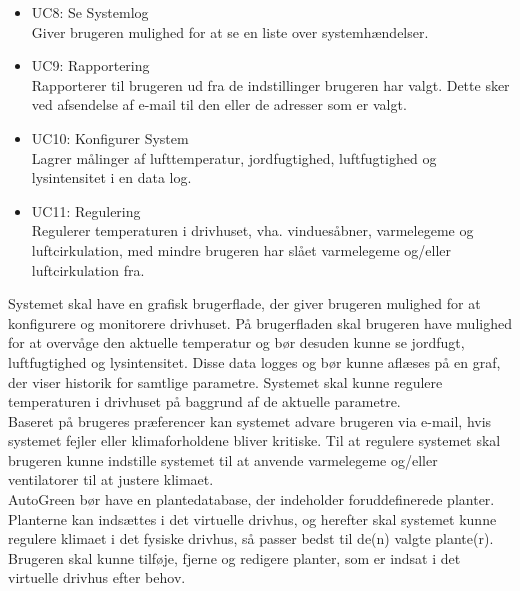 \begin{itemize}
\item UC8: Se Systemlog \\
Giver brugeren mulighed for at se en liste over systemhændelser.

\item UC9: Rapportering \\
Rapporterer til brugeren ud fra de indstillinger brugeren har valgt. Dette sker ved afsendelse af e-mail til den eller de adresser som er valgt. 

\item UC10: Konfigurer System \\
Lagrer målinger af lufttemperatur, jordfugtighed, luftfugtighed og lysintensitet i en
data log.

\item UC11: Regulering \\
Regulerer temperaturen i drivhuset, vha. vinduesåbner, varmelegeme og luftcirkulation, med mindre brugeren har slået varmelegeme og/eller luftcirkulation fra.

\end{itemize}

Systemet skal have en grafisk brugerflade, der giver brugeren mulighed for at konfigurere og monitorere drivhuset. På brugerfladen skal brugeren have mulighed for at overvåge den aktuelle temperatur og bør desuden kunne se jordfugt, luftfugtighed og lysintensitet. Disse data logges og bør kunne aflæses på en graf, der viser historik for samtlige parametre. Systemet skal kunne regulere temperaturen i drivhuset på baggrund af de aktuelle parametre.\\
Baseret på brugeres præferencer kan systemet advare brugeren via e-mail, hvis systemet fejler eller klimaforholdene bliver kritiske. Til at regulere systemet skal brugeren kunne indstille systemet til at anvende varmelegeme og/eller ventilatorer til at justere klimaet. \\
AutoGreen bør have en plantedatabase, der indeholder foruddefinerede planter. Planterne kan indsættes i det virtuelle drivhus, og herefter skal systemet kunne regulere klimaet i det fysiske drivhus, så passer bedst til de(n) valgte plante(r). Brugeren skal kunne tilføje, fjerne og redigere planter, som er indsat i det virtuelle drivhus efter behov.

\clearpage